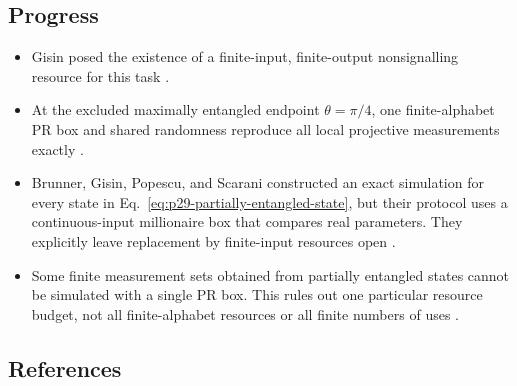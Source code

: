 \subsection*{Progress}

\begin{itemize}
  \item Gisin posed the existence of a finite-input, finite-output
  nonsignalling resource for this task
  .

  \item At the excluded maximally entangled endpoint $\theta=\pi/4$, one
  finite-alphabet PR box and shared randomness reproduce all local projective
  measurements exactly .

  \item Brunner, Gisin, Popescu, and Scarani constructed an exact simulation
  for every state in Eq.~\eqref{eq:p29-partially-entangled-state}, but their
  protocol uses a continuous-input millionaire box that compares real
  parameters.  They explicitly leave replacement by finite-input resources
  open .

  \item Some finite measurement sets obtained from partially entangled states
  cannot be simulated with a single PR box.  This rules out one particular
  resource budget, not all finite-alphabet resources or all finite numbers of
  uses .
\end{itemize}

\subsection*{References}

